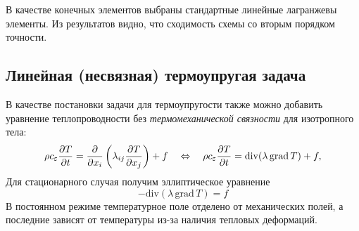 \documentclass[12pt, a4paper]{article}
\begin{document}
В качестве конечных элементов выбраны стандартные линейные лагранжевы элементы. Из результатов видно, что сходимость схемы со вторым порядком точности.
\subsection{Линейная (несвязная) термоупругая задача}
В качестве постановки задачи для термоупругости также можно добавить уравнение теплопроводности без \textit{термомеханической связности} для изотропного тела:
\[
\rho c_\varepsilon\frac{\partial T}{\partial t} =\frac{\partial}{\partial x_i}\left(\lambda_{ij}\frac{\partial T}{\partial x_j}\right)+f\quad \Leftrightarrow\quad \rho c_\varepsilon\frac{\partial T}{\partial t}=\mathrm{div}(\lambda\,\mathrm{grad}\, T)+f,
\]
Для стационарного случая получим эллиптическое уравнение
\begin{equation}
-\mathrm{div}(\lambda\,\mathrm{grad}\, T)=f
\label{sta}
\end{equation}
В постоянном режиме температурное поле отделено от механических полей, а последние зависят от температуры из-за наличия тепловых деформаций.
\bigskip
\end{document}
